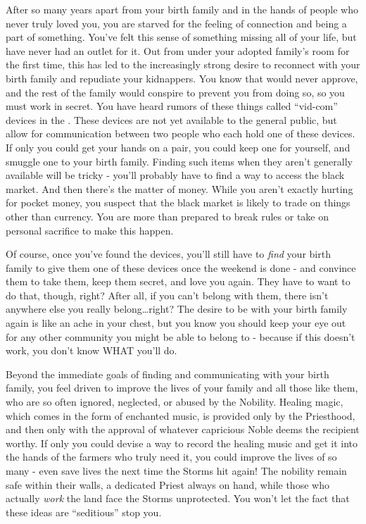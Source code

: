 \documentclass[char]{GL2020}
\begin{document}
After so many years apart from your birth family and in the hands of people who never truly loved you, you are starved for the feeling of connection and being a part of something. You’ve felt this sense of something missing all of your life, but have never had an outlet for it.  Out from under your adopted family’s room for the first time, this has led to the increasingly strong desire to reconnect with your birth family and repudiate your kidnappers. You know that \cAdoptedParentOne{} would never approve, and the rest of the family would conspire to prevent you from doing so, so you must work in secret. You have heard rumors of these things called ``vid-com'' devices in the \pTech{}. These devices are not yet available to the general public, but allow for communication between two people who each hold one of these devices. If only you could get your hands on a pair, you could keep one for yourself, and smuggle one to your birth family. Finding such items when they aren't generally available will be tricky - you'll probably have to find a way to access the black market. And then there's the matter of money. While you aren't exactly hurting for pocket money, you suspect that the black market is likely to trade on things other than \pFarm{} currency. You are more than prepared to break rules or take on personal sacrifice to make this happen.

Of course, once you’ve found the devices, you'll still have to \emph{find} your birth family to give them one of these devices once the weekend is done - and convince them to take them, keep them secret, and love you again. They have to want to do that, though, right? After all, if you can’t belong with them, there isn’t anywhere else you really belong\ldots right?  The desire to be with your birth family again is like an ache in your chest, but you know you should keep your eye out for any other community you might be able to belong to - because if this doesn’t work, you don’t know WHAT you’ll do.

Beyond the immediate goals of finding and communicating with your birth family, you feel driven to improve the lives of your family and all those like them, who are so often ignored, neglected, or abused by the Nobility.  Healing magic, which comes in the form of enchanted music, is provided only by the Priesthood, and then only with the approval of whatever capricious Noble deems the recipient worthy.  If only you could devise a way to record the healing music and get it into the hands of the farmers who truly need it, you could improve the lives of so many - even save lives the next time the Storms hit \pFarm{} again!  The nobility remain safe within their walls, a dedicated Priest always on hand, while those who actually \emph{work} the land face the Storms unprotected.  You won't let the fact that these ideas are ``seditious''  stop you.
\end{document}
